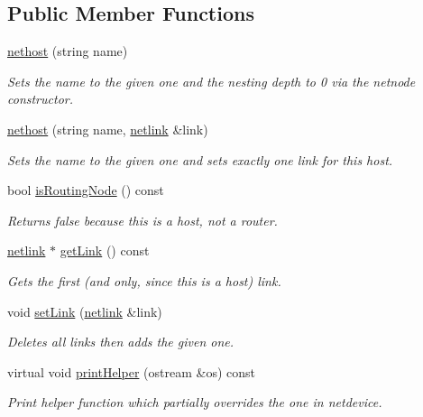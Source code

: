 \subsection*{Public Member Functions}
\begin{DoxyCompactItemize}
\item 
\hyperlink{classnethost_aa5adfed919c8bf202bfba51b8cd68b34}{nethost} (string name)
\begin{DoxyCompactList}\small\item\em Sets the name to the given one and the nesting depth to 0 via the {\ttfamily netnode} constructor. \end{DoxyCompactList}\item 
\hyperlink{classnethost_ae13dd118e3f4e9f7892a3c8e733a1f48}{nethost} (string name, \hyperlink{classnetlink}{netlink} \&link)
\begin{DoxyCompactList}\small\item\em Sets the name to the given one and sets exactly one link for this host. \end{DoxyCompactList}\item 
bool \hyperlink{classnethost_ad1d207431110c8c254883cf02e8fd471}{is\-Routing\-Node} () const 
\begin{DoxyCompactList}\small\item\em Returns false because this is a host, not a router. \end{DoxyCompactList}\item 
\hyperlink{classnetlink}{netlink} $\ast$ \hyperlink{classnethost_a953214ef8b8de37f7db7a384a80a7b72}{get\-Link} () const 
\begin{DoxyCompactList}\small\item\em Gets the first (and only, since this is a host) link. \end{DoxyCompactList}\item 
void \hyperlink{classnethost_a9d374520690dd6fe8d04d68b330c41a1}{set\-Link} (\hyperlink{classnetlink}{netlink} \&link)
\begin{DoxyCompactList}\small\item\em Deletes all links then adds the given one. \end{DoxyCompactList}\item 
virtual void \hyperlink{classnethost_a1deafa5ff406d3b5d94d8fdf759a0951}{print\-Helper} (ostream \&os) const 
\begin{DoxyCompactList}\small\item\em Print helper function which partially overrides the one in {\ttfamily netdevice}. \end{DoxyCompactList}\end{DoxyCompactItemize}

